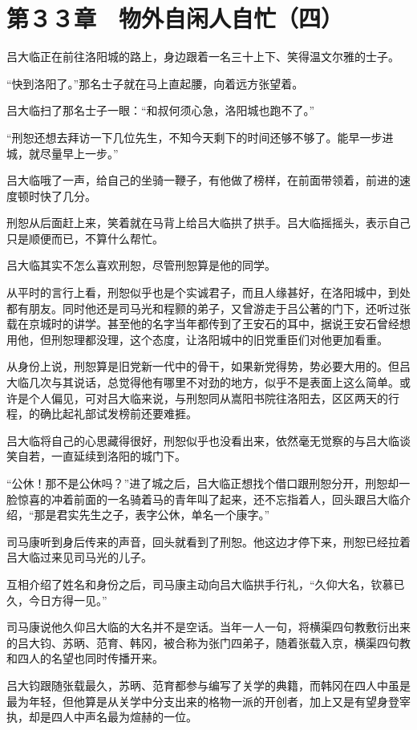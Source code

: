 \section{第３３章　物外自闲人自忙（四）}

吕大临正在前往洛阳城的路上，身边跟着一名三十上下、笑得温文尔雅的士子。

“快到洛阳了。”那名士子就在马上直起腰，向着远方张望着。

吕大临扫了那名士子一眼：“和叔何须心急，洛阳城也跑不了。”

“刑恕还想去拜访一下几位先生，不知今天剩下的时间还够不够了。能早一步进城，就尽量早上一步。”

吕大临哦了一声，给自己的坐骑一鞭子，有他做了榜样，在前面带领着，前进的速度顿时快了几分。

刑恕从后面赶上来，笑着就在马背上给吕大临拱了拱手。吕大临摇摇头，表示自己只是顺便而已，不算什么帮忙。

吕大临其实不怎么喜欢刑恕，尽管刑恕算是他的同学。

从平时的言行上看，刑恕似乎也是个实诚君子，而且人缘甚好，在洛阳城中，到处都有朋友。同时他还是司马光和程颢的弟子，又曾游走于吕公著的门下，还听过张载在京城时的讲学。甚至他的名字当年都传到了王安石的耳中，据说王安石曾经想用他，但刑恕理都没理，这个态度，让洛阳城中的旧党重臣们对他更加看重。

从身份上说，刑恕算是旧党新一代中的骨干，如果新党得势，势必要大用的。但吕大临几次与其说话，总觉得他有哪里不对劲的地方，似乎不是表面上这么简单。或许是个人偏见，可对吕大临来说，与刑恕同从嵩阳书院往洛阳去，区区两天的行程，的确比起礼部试发榜前还要难捱。

吕大临将自己的心思藏得很好，刑恕似乎也没看出来，依然毫无觉察的与吕大临谈笑自若，一直延续到洛阳的城门下。

“公休！那不是公休吗？”进了城之后，吕大临正想找个借口跟刑恕分开，刑恕却一脸惊喜的冲着前面的一名骑着马的青年叫了起来，还不忘指着人，回头跟吕大临介绍，“那是君实先生之子，表字公休，单名一个康字。”

司马康听到身后传来的声音，回头就看到了刑恕。他这边才停下来，刑恕已经拉着吕大临过来见司马光的儿子。

互相介绍了姓名和身份之后，司马康主动向吕大临拱手行礼，“久仰大名，钦慕已久，今日方得一见。”

司马康说他久仰吕大临的大名并不是空话。当年一人一句，将横渠四句教敷衍出来的吕大钧、苏昞、范育、韩冈，被合称为张门四弟子，随着张载入京，横渠四句教和四人的名望也同时传播开来。

吕大钧跟随张载最久，苏昞、范育都参与编写了关学的典籍，而韩冈在四人中虽是最为年轻，但他算是从关学中分支出来的格物一派的开创者，加上又是有望身登宰执，却是四人中声名最为煊赫的一位。

